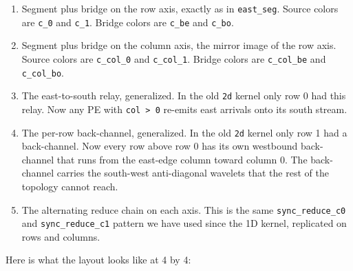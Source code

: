 \documentclass[11pt]{article}
\newcommand{\code}[1]{\texttt{#1}}
\begin{document}
\begin{enumerate}[leftmargin=1.3em,itemsep=0.15em]
  \item Segment plus bridge on the row axis, exactly as in
    \code{east\_seg}. Source colors are \code{c\_0} and
    \code{c\_1}. Bridge colors are \code{c\_be} and
    \code{c\_bo}.
  \item Segment plus bridge on the column axis, the mirror
    image of the row axis. Source colors are \code{c\_col\_0}
    and \code{c\_col\_1}. Bridge colors are \code{c\_col\_be}
    and \code{c\_col\_bo}.
  \item The east-to-south relay, generalized. In the old
    \code{2d} kernel only row 0 had this relay. Now any PE with
    \code{col > 0} re-emits east arrivals onto its south
    stream.
  \item The per-row back-channel, generalized. In the old
    \code{2d} kernel only row 1 had a back-channel. Now every
    row above row 0 has its own westbound back-channel that
    runs from the east-edge column toward column 0. The
    back-channel carries the south-west anti-diagonal wavelets
    that the rest of the topology cannot reach.
  \item The alternating reduce chain on each axis. This is the
    same \code{sync\_reduce\_c0} and \code{sync\_reduce\_c1}
    pattern we have used since the 1D kernel, replicated on
    rows and columns.
\end{enumerate}

Here is what the layout looks like at 4 by 4:
\end{document}
